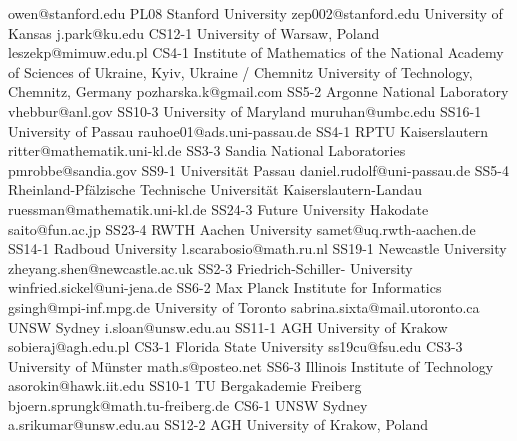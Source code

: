 \begin{multicols}{2}
{ owen@stanford.edu }
{PL08}
{}
{ Stanford University }
{ zep002@stanford.edu }
{}
{}
{ University of Kansas }
{ j.park@ku.edu }
{CS12-1}
{}
{ University of Warsaw, Poland }
{ leszekp@mimuw.edu.pl }
{CS4-1}
{}
{ Institute of Mathematics of the National Academy of Sciences of Ukraine,  Kyiv, Ukraine / Chemnitz University of Technology, Chemnitz, Germany }
{ pozharska.k@gmail.com }
{SS5-2}
{}
{ Argonne National Laboratory }
{ vhebbur@anl.gov }
{SS10-3}
{}
{ University of Maryland }
{ muruhan@umbc.edu }
{SS16-1}
{}
{ University of Passau }
{ rauhoe01@ads.uni-passau.de }
{SS4-1}
{}
{ RPTU Kaiserslautern }
{ ritter@mathematik.uni-kl.de }
{SS3-3}
{}
{ Sandia National Laboratories }
{ pmrobbe@sandia.gov }
{SS9-1}
{}
{ Universität Passau }
{ daniel.rudolf@uni-passau.de }
{SS5-4}
{}
{ Rheinland-Pfälzische Technische Universität Kaiserslautern-Landau }
{ ruessman@mathematik.uni-kl.de }
{SS24-3}
{}
{ Future University Hakodate }
{ saito@fun.ac.jp }
{SS23-4}
{}
{ RWTH Aachen University }
{ samet@uq.rwth-aachen.de }
{SS14-1}
{}
{ Radboud University }
{ l.scarabosio@math.ru.nl }
{SS19-1}
{}
{ Newcastle University }
{ zheyang.shen@newcastle.ac.uk }
{SS2-3}
{}
{ Friedrich-Schiller- University }
{ winfried.sickel@uni-jena.de }
{SS6-2}
{}
{ Max Planck Institute for Informatics }
{ gsingh@mpi-inf.mpg.de }
{}
{}
{ University of Toronto }
{ sabrina.sixta@mail.utoronto.ca }
{}
{}
{ UNSW Sydney }
{ i.sloan@unsw.edu.au }
{SS11-1}
{}
{ AGH University of Krakow }
{ sobieraj@agh.edu.pl }
{CS3-1}
{}
{ Florida State University }
{ ss19cu@fsu.edu }
{CS3-3}
{}
{ University of Münster }
{ math.s@posteo.net }
{SS6-3}
{}
{ Illinois Institute of Technology }
{ asorokin@hawk.iit.edu }
{SS10-1}
{}
{ TU Bergakademie Freiberg }
{ bjoern.sprungk@math.tu-freiberg.de }
{CS6-1}
{}
{ UNSW Sydney }
{ a.srikumar@unsw.edu.au }
{SS12-2}
{}
{ AGH University of Krakow, Poland }

\end{multicols}
